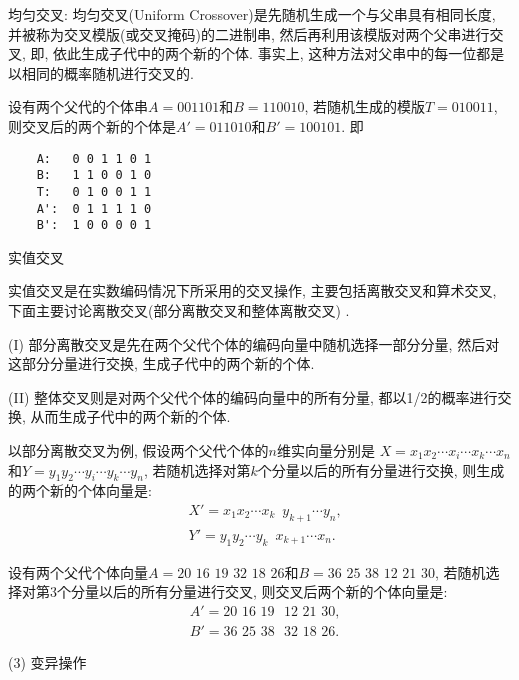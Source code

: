  均匀交叉: 均匀交叉(Uniform Crossover)是先随机生成一个与父串具有相同长度, 并被称为交叉模版(或交叉掩码)的二进制串, 然后再利用该模版对两个父串进行交叉, 即, 依此生成子代中的两个新的个体.
事实上, 这种方法对父串中的每一位都是以相同的概率随机进行交叉的.


设有两个父代的个体串$A=001101$和$B=110010$, 若随机生成的模版$T=010011$, 则交叉后的两个新的个体是$A'=011010$和$B'=100101$. 即
\begin{center}
\begin{Verbatim}
    A:   0 0 1 1 0 1
    B:   1 1 0 0 1 0
    T:   0 1 0 0 1 1
    A':  0 1 1 1 1 0
    B':  1 0 0 0 0 1
\end{Verbatim}
\end{center}

     实值交叉

实值交叉是在实数编码情况下所采用的交叉操作, 主要包括离散交叉和算术交叉, 下面主要讨论离散交叉(部分离散交叉和整体离散交叉) .

(I) 部分离散交叉是先在两个父代个体的编码向量中随机选择一部分分量, 然后对这部分分量进行交换, 生成子代中的两个新的个体.

(II) 整体交叉则是对两个父代个体的编码向量中的所有分量, 都以1/2的概率进行交换, 从而生成子代中的两个新的个体.


\begin{example}
以部分离散交叉为例, 假设两个父代个体的$n$维实向量分别是 $X=x_1x_2\cdots x_i\cdots x_k\cdots x_n$和$Y=y_1 y_2\cdots y_i \cdots y_k \cdots y_n$, 若随机选择对第$k$个分量以后的所有分量进行交换, 则生成的两个新的个体向量是:
\begin{align*}
  &X'= x_1 x_2 \cdots x_k\,\,\, y_{k+1} \cdots y_n,\\
  &Y'= y_1 y_2 \cdots y_k\,\,\, x_{k+1} \cdots x_n.
\end{align*}

设有两个父代个体向量$A=20\,\,  16\,\,  19\,\,  32 \,\, 18 \,\, 26$和$B=36\,\,  25\,\,  38\,\,  12\,\,  21\,\,  30$, 若随机选择对第3个分量以后的所有分量进行交叉, 则交叉后两个新的个体向量是:
\begin{align*}
  &A'= 20\,\, 16\,\,  19\,\,\,\,  12\,\,  21\,\,  30,\\
  &B'= 36\,\,  25\,\,  38\,\,\,\,  32\,\,  18\,\,  26.
\end{align*}
\vspace{-0.4cm}
\end{example}

 (3) 变异操作

